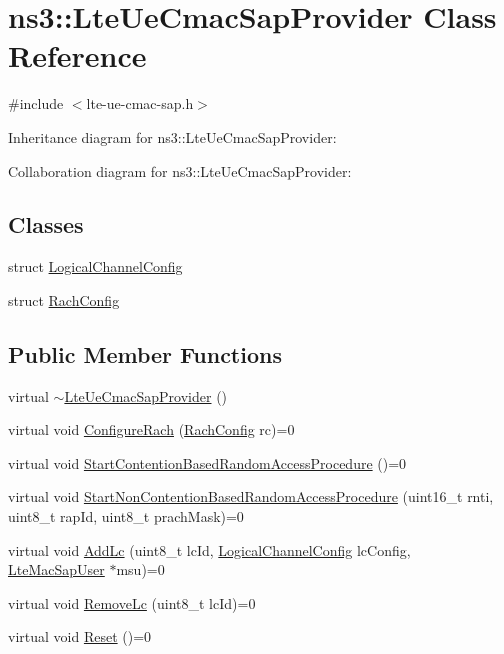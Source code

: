 \hypertarget{classns3_1_1LteUeCmacSapProvider}{}\section{ns3\+:\+:Lte\+Ue\+Cmac\+Sap\+Provider Class Reference}
\label{classns3_1_1LteUeCmacSapProvider}


{\ttfamily \#include $<$lte-\/ue-\/cmac-\/sap.\+h$>$}



Inheritance diagram for ns3\+:\+:Lte\+Ue\+Cmac\+Sap\+Provider\+:


Collaboration diagram for ns3\+:\+:Lte\+Ue\+Cmac\+Sap\+Provider\+:
\subsection*{Classes}
\begin{DoxyCompactItemize}
\item 
struct \hyperlink{structns3_1_1LteUeCmacSapProvider_1_1LogicalChannelConfig}{Logical\+Channel\+Config}
\item 
struct \hyperlink{structns3_1_1LteUeCmacSapProvider_1_1RachConfig}{Rach\+Config}
\end{DoxyCompactItemize}
\subsection*{Public Member Functions}
\begin{DoxyCompactItemize}
\item 
virtual \hyperlink{classns3_1_1LteUeCmacSapProvider_a4d1812a53079d18b2f34cd524a41447d}{$\sim$\+Lte\+Ue\+Cmac\+Sap\+Provider} ()
\item 
virtual void \hyperlink{classns3_1_1LteUeCmacSapProvider_a91b4dbb51b9c382dfe0a763da75d9f09}{Configure\+Rach} (\hyperlink{structns3_1_1LteUeCmacSapProvider_1_1RachConfig}{Rach\+Config} rc)=0
\item 
virtual void \hyperlink{classns3_1_1LteUeCmacSapProvider_acf84605c9506cc70372dd238aeb5791f}{Start\+Contention\+Based\+Random\+Access\+Procedure} ()=0
\item 
virtual void \hyperlink{classns3_1_1LteUeCmacSapProvider_ad2b328271d2631f4800b9d7a8567c6e9}{Start\+Non\+Contention\+Based\+Random\+Access\+Procedure} (uint16\+\_\+t rnti, uint8\+\_\+t rap\+Id, uint8\+\_\+t prach\+Mask)=0
\item 
virtual void \hyperlink{classns3_1_1LteUeCmacSapProvider_a62f2d731c336ca14e98e95a3215e92ec}{Add\+Lc} (uint8\+\_\+t lc\+Id, \hyperlink{structns3_1_1LteUeCmacSapProvider_1_1LogicalChannelConfig}{Logical\+Channel\+Config} lc\+Config, \hyperlink{classns3_1_1LteMacSapUser}{Lte\+Mac\+Sap\+User} $\ast$msu)=0
\item 
virtual void \hyperlink{classns3_1_1LteUeCmacSapProvider_a4d1b9e67debe6acb4558dcff8788349c}{Remove\+Lc} (uint8\+\_\+t lc\+Id)=0
\item 
virtual void \hyperlink{classns3_1_1LteUeCmacSapProvider_ae020f759b912c9347cd0845defb247de}{Reset} ()=0
\end{DoxyCompactItemize}



